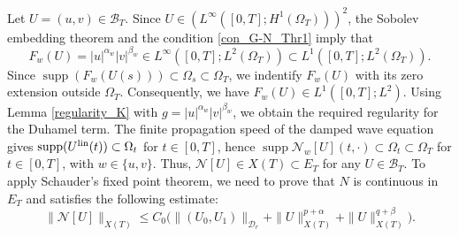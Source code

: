 \documentclass[11pt,reqno]{amsart}
\DeclareMathOperator{\supp}{supp}
\begin{document}
	 Let $U=(u,v)\in \mathcal{B}_T$. Since $U\in(L^\infty([0,T];H^1(\Omega_T)))^2$, the Sobolev embedding theorem and the condition \eqref{con_G-N_Thr1} imply that 
	\[
	F_w(U)=|u|^{\alpha_w}|v|^{\beta_w}\in L^\infty([0,T];L^2(\Omega_T))\subset L^1([0,T];L^2(\Omega_T)).
	\]
	Since $\supp (F_w(U(s)))\subset\Omega_s\subset \Omega_T$, we indentify $F_w(U)$ with its zero extension outside $\Omega_T$. Consequently, we have $F_w(U)\in L^1([0,T];L^2)$. Using Lemma \ref{regularity_K} with $g=|u|^{\alpha_w}|v|^{\beta_w}$, we obtain the required regularity for the Duhamel term. The finite propagation speed of the damped wave equation gives $\supp (U^{\rm lin}(t))\subset \Omega_t$ for $t\in [0,T]$, hence $\supp \mathcal{N}_w[U](t,\cdot)\subset\Omega_t\subset \Omega_T$ for $t\in [0,T]$, with $w\in\{u,v\}$. Thus, $\mathcal{N}[U]\in X(T)\subset E_T$ for any $U\in\mathcal{B}_T$. To apply Schauder's fixed point theorem, we need to prove that $N$ is continuous in $E_T$ and satisfies the following estimate:
	\begin{equation}\label{keyestimate_Thr1globalexistence}
		\|\mathcal{N}[U]\|_{X(T)}\leq C_0\big(\|(U_0,U_1)\|_{\mathcal{D}_{r}}+\|U\|^{p+\alpha}_{X(T)}+\|U\|^{q+\beta}_{X(T)}\big).
	\end{equation}
	
\end{document}

